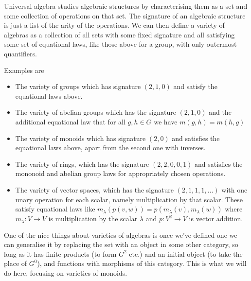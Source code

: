 \documentclass[fleqn]{NotesClass}
\begin{document}
    Universal algebra studies algebraic structures by characterising them as a set and some collection of operations on that set.
    The signature of an algebraic structure is just a list of the arity of the operations.
    We can then define a variety of algebras as a collection of all sets with some fixed signature and all satisfying some set of equational laws, like those above for a group, with only outermost quantifiers.
    
    Examples are
    \begin{itemize}
        \item The variety of groups which has signature \((2, 1, 0)\) and satisfy the equational laws above.
        \item The variety of abelian groups which has the signature \((2, 1, 0)\) and the additional equational law that for all \(g, h \in G\) we have \(m(g, h) = m(h, g)\)
        \item The variety of monoids which has signature \((2, 0)\) and satisfies the equational laws above, apart from the second one with inverses.
        \item The variety of rings, which has the signature \((2, 2, 0, 0, 1)\) and satisfies the mononoid and abelian group laws for appropriately chosen operations.
        \item The variety of vector spaces, which has the signature \((2, 1, 1, 1, \dotsc)\) with one unary operation for each scalar, namely multiplication by that scalar.
        These satisfy equational laws like \(m_\lambda(p(v, w)) = p(m_\lambda(v), m_\lambda(w))\) where \(m_\lambda \colon V \to V\) is multiplication by the scalar \(\lambda\) and \(p\colon V^2 \to V\) is vector addition.
    \end{itemize}
    
    One of the nice things about varieties of algebras is once we've defined one we can generalise it by replacing the set with an object in some other category, so long as it has finite products (to form \(G^2\) etc.) and an initial object (to take the place of \(G^0\)), and functions with morphisms of this category.
    This is what we will do here, focusing on varieties of monoids.
    
\end{document}
